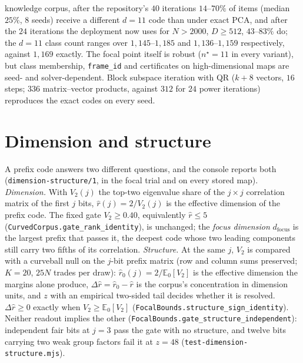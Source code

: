 \documentclass[11pt,a4paper]{article}
\theoremstyle{plain}
\theoremstyle{remark}
\begin{document}
knowledge corpus, after the repository's $40$ iterations $14$--$70\%$ of items (median $25\%$, $8$ seeds) receive a different $d=11$ code than under exact PCA, and after the $24$ iterations the deployment now uses for $N>2000$, $D\ge512$, $43$--$83\%$ do; the $d=11$ class count ranges over $1{,}145$--$1{,}185$ and $1{,}136$--$1{,}159$ respectively, against $1{,}169$ exactly. The focal point itself is robust ($n^\star=11$ in every variant), but class membership, \texttt{frame\_id} and certificates on high-dimensional maps are seed- and solver-dependent. Block subspace iteration with QR ($k+8$ vectors, $16$ steps; $336$ matrix--vector products, against $312$ for $24$ power iterations) reproduces the exact codes on every seed.

\section{Dimension and structure}
\label{sec:dimstruct}

{\sloppy A prefix code answers two different questions, and the console reports both (\texttt{dimension-structure/1}, in the focal trial and on every stored map). \emph{Dimension.} With $V_2(j)$ the top-two eigenvalue share of the $j\times j$ correlation matrix of the first $j$ bits, $\hat r(j)=2/V_2(j)$ is the effective dimension of the prefix code. The fixed gate $V_2\ge0.40$, equivalently $\hat r\le5$ (\texttt{CurvedCorpus.gate\_rank\_identity}), is unchanged; the \emph{focus dimension} $d_{\mathrm{focus}}$ is the largest prefix that passes it, the deepest code whose two leading components still carry two fifths of its correlation. \emph{Structure.} At the same $j$, $V_2$ is compared with a curveball null on the $j$-bit prefix matrix (row and column sums preserved; $K=20$, $25N$ trades per draw): $\hat r_0(j)=2/\mathbb{E}_0[V_2]$ is the effective dimension the margins alone produce, $\Delta\hat r=\hat r_0-\hat r$ is the corpus's concentration in dimension units, and $z$ with an empirical two-sided tail decides whether it is resolved. $\Delta\hat r\ge0$ exactly when $V_2\ge\mathbb{E}_0[V_2]$ (\texttt{FocalBounds.structure\_sign\_identity}). Neither readout implies the other (\texttt{FocalBounds.gate\_structure\_independent}): independent fair bits at $j=3$ pass the gate with no structure, and twelve bits carrying two weak group factors fail it at $z=48$ (\texttt{test-dimension-structure.mjs}).\par}
\end{document}
